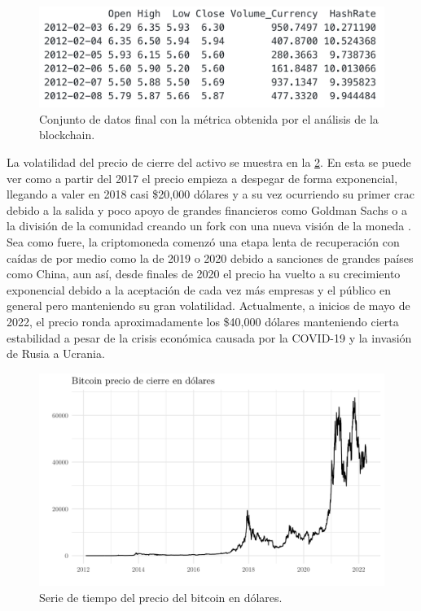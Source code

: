\begin{figure}[h!]
	\centering
	\includegraphics[scale=0.5]{Chapter5/ohlcv_complete.png}
	\caption{Conjunto de datos final con la métrica obtenida por el análisis de la blockchain.}
	\label{fig17}
\end{figure}

La volatilidad del precio de cierre del activo se muestra en la \cref{fig18}. En esta se puede ver como a partir del 2017 el precio empieza a despegar de forma exponencial, llegando a valer en 2018 casi \$20,000 dólares y a su vez ocurriendo su primer crac debido a la salida y poco apoyo de grandes financieros como Goldman Sachs o a la división de la comunidad creando un fork con una nueva visión de la moneda \parencite{peterssonWhyBitcoinCrashed2018}. Sea como fuere, la criptomoneda comenzó una etapa lenta de recuperación con caídas de por medio como la de 2019 o 2020 debido a sanciones de grandes países como China, aun así, desde finales de 2020 el precio ha vuelto a su crecimiento exponencial debido a la aceptación de cada vez más empresas y el público en general pero manteniendo su gran volatilidad. Actualmente, a inicios de mayo de 2022, el precio ronda aproximadamente los \$40,000 dólares manteniendo cierta estabilidad a pesar de la crisis económica causada por la COVID-19 y la invasión de Rusia a Ucrania.

\begin{figure}[h!]
	\centering
	\includegraphics[scale=0.35]{Chapter5/btc_price.png}
	\caption{Serie de tiempo del precio del bitcoin en dólares.}
	\label{fig18}
\end{figure}

